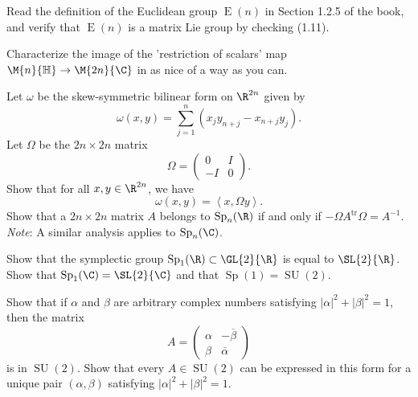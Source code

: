 \documentclass[10pt]{amsart}
\begin{document}
\begin{ex}
  Read the definition of the Euclidean group $\operatorname{E}(n)$ in Section 1.2.5 of the book, and verify that $\operatorname{E}(n)$ is a matrix Lie group by checking (1.11).
\end{ex}

\begin{ex}
  Characterize the image of the 'restriction of scalars' map $\M{n}{\mathbb{H}} \rightarrow \M{2n}{\C}$ in as nice of a way as you can.
\end{ex}

\begin{ex}
  Let $\omega$ be the skew-symmetric bilinear form on $\R^{2n}$ given by 
  $$\omega(x,y) = \sum_{j = 1}^n (x_jy_{n + j} - x_{n+j}y_j).$$
  Let $\Omega$ be the $2n \times 2n$ matrix
  $$\Omega = \left(\begin{matrix}
    0 & I\\
    -I & 0
    \end{matrix}\right).$$
  Show that for all $x,y \in \R^{2n}$, we have
  $$\omega(x,y) = \left<x, \Omega y\right>.$$
  Show that a $2n \times 2n$ matrix $A$ belongs to $\operatorname{Sp}_n(\R)$ if and only if $-\Omega A^\text{tr} \Omega = A^{-1}$.\\
  {\it Note}: A similar analysis applies to $\operatorname{Sp}_n(\C)$.
\end{ex}

\begin{ex}
  Show that the symplectic group $\operatorname{Sp}_1(\R) \subset \GL{2}{\R}$ is equal to $\SL{2}{\R}$.
  Show that $\operatorname{Sp}_1(\C) = \SL{2}{\C}$ and that $\operatorname{Sp}(1) = \operatorname{SU}(2)$.
\end{ex}

\begin{ex}
  Show that if $\alpha$ and $\beta$ are arbitrary complex numbers satisfying $|\alpha|^2 + |\beta|^2 = 1$, then the matrix
  $$A = \left(\begin{matrix}
    \alpha & -\overline{\beta}\\
    \beta & \overline{\alpha}
  \end{matrix}\right)$$
  is in $\operatorname{SU}(2)$.
  Show that every $A \in \operatorname{SU}(2)$ can be expressed in this form for a unique pair $(\alpha, \beta)$ satisfying $|\alpha|^2 + |\beta|^2 = 1$.
\end{ex}
\end{document}
